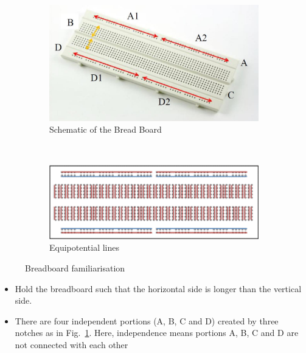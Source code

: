 \documentclass[9pt]{scrreprt}
\begin{document}
\begin{figure}[H]
    \centering
    \begin{subfigure}[b]{0.6\textwidth}
        \centering
        \includegraphics[width=\linewidth]{logos/Breadboard.png}
        \caption{Schematic of the Bread Board}
        \label{fig:Breadboard}
    \end{subfigure}
    \\
    \begin{subfigure}[b]{0.45\textwidth}
        \centering
        \includegraphics[width=\textwidth]{logos/Breadboard_connections.png}
        \caption{Equipotential lines}
        \label{fig:Breadboard_connections}
    \end{subfigure}
    \caption{Breadboard familiarisation}
    \label{fig:Breadboard familiarisation}
\end{figure}

\begin{itemize}
\item Hold the breadboard such that the horizontal side is longer than the vertical side.
\item There are four independent portions (A, B, C and D) created by three notches as in Fig.~\ref{fig:Breadboard}. Here, independence means portions A, B, C and D are not connected with each other
\end{itemize}
\end{document}
